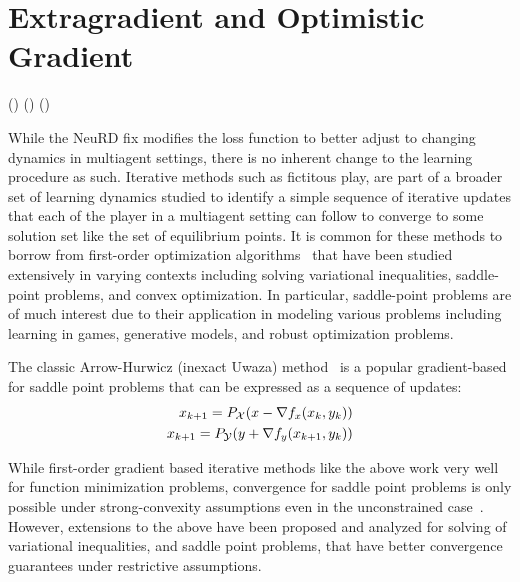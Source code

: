 \section{Extragradient and Optimistic Gradient}
 ()
 ()
 ()

While the NeuRD fix modifies the loss function to better adjust to changing dynamics in multiagent
settings, there is no inherent change to the learning procedure as such.
Iterative methods such as fictitous play, are part of a broader set of learning dynamics studied to
identify a simple sequence of iterative updates that each of the player in a multiagent setting can
follow to converge to some solution set like the set of equilibrium points.
It is common for these methods to borrow from first-order optimization
algorithms~\cite{beckFirstOrder2017} that have been studied extensively in varying contexts
including solving variational inequalities, saddle-point problems, and convex optimization.
In particular, saddle-point problems are of much interest due to their application in modeling
various problems including learning in games, generative models, and robust optimization problems.

The classic Arrow-Hurwicz (inexact Uwaza) method~\cite{arrowStudies1958} is a popular
gradient-based for saddle point problems that can be expressed as a sequence of updates:
\begin{equation}
	\label{eqn:arrowhurwicz}
	\begin{split}
		x_{k+1} = P_{\mathcal{X}} (x - \nabla f_x(x_k, y_k)) \\
		x_{k+1} = P_{\mathcal{Y}} (y + \nabla f_y(x_{k+1}, y_k)) \\
	\end{split}
\end{equation}

While first-order gradient based iterative methods like
the above work very well for function minimization problems, convergence for saddle point problems
is only possible under strong-convexity assumptions even in the unconstrained
case~\cite{heConvergence2022}.
However, extensions to the above have been proposed and analyzed for solving of variational
inequalities, and saddle point problems, that have better convergence guarantees under restrictive
assumptions.


